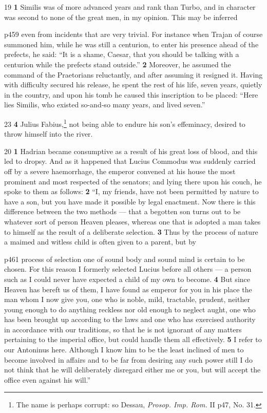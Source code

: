 19
\textbf{1} Similis was of more advanced years and rank than Turbo, and in character was second to none of the great men, in my opinion. This may be inferred

p459 even from incidents that are very trivial. For instance when Trajan of course summoned him, while he was still a centurion, to enter his presence ahead of the prefects, he said: ``It is a shame, Caesar, that you should be talking with a centurion while the prefects stand outside.'' \textbf{2} Moreover, he assumed the command of the Praetorians reluctantly, and after assuming it resigned it. Having with difficulty secured his release, he spent the rest of his life, seven years, quietly in the country, and upon his tomb he caused this inscription to be placed: ``Here lies Similis, who existed so-and\texthebrew{‑}so many years, and lived seven.''

23
\textbf{4} Julius Fabius,\texthebrew{⁠}\footnote{The name is perhaps corrupt: so Dessau, \emph{Prosop. Imp. Rom.} II p47, No. 31.

} not being able to endure his son's effeminacy, desired to throw himself into the river.

20
\textbf{1} Hadrian became consumptive as a result of his great loss of blood, and this led to dropsy. And as it happened that Lucius Commodus was suddenly carried off by a severe haemorrhage, the emperor convened at his house the most prominent and most respected of the senators; and lying there upon his couch, he spoke to them as follows: \textbf{2} ``I, my friends, have not been permitted by nature to have a son, but you have made it possible by legal enactment. Now there is this difference between the two methods \texthebrew{—} that a begotten son turns out to be whatever sort of person Heaven pleases, whereas one that is adopted a man takes to himself as the result of a deliberate selection. \textbf{3} Thus by the process of nature a maimed and witless child is often given to a parent, but by

p461 process of selection one of sound body and sound mind is certain to be chosen. For this reason I formerly selected Lucius before all others \texthebrew{—} a person such as I could never have expected a child of my own to become. \textbf{4} But since Heaven has bereft us of them, I have found as emperor for you in his place the man whom I now give you, one who is noble, mild, tractable, prudent, neither young enough to do anything reckless nor old enough to neglect aught, one who has been brought up according to the laws and one who has exercised authority in accordance with our traditions, so that he is not ignorant of any matters pertaining to the imperial office, but could handle them all effectively. \textbf{5} I refer to our Antoninus here. Although I know him to be the least inclined of men to become involved in affairs and to be far from desiring any such power still I do not think that he will deliberately disregard either me or you, but will accept the office even against his will.''


